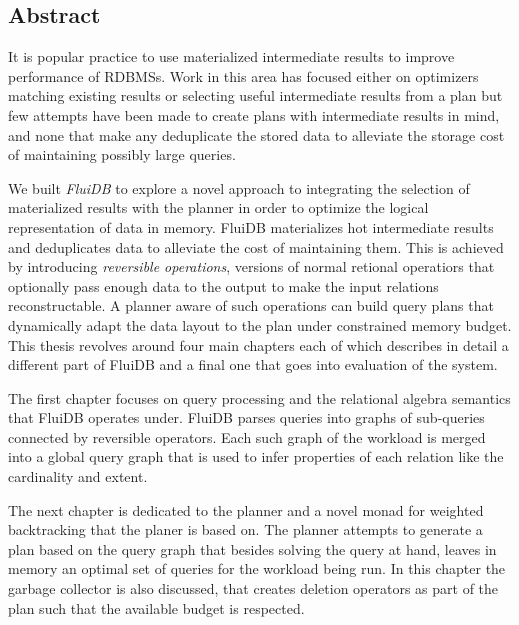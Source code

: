 \setcounter{page}{1}%

\maketitle%

\begin{precontent}

\chapter{Abstract}%
It is popular practice to use materialized intermediate results to
improve performance of RDBMSs. Work in this area has focused either on
optimizers matching existing results or selecting useful intermediate
results from a plan but few attempts have been made to create plans
with intermediate results in mind, and none that make any deduplicate
the stored data to alleviate the storage cost of maintaining possibly
large queries.

We built \emph{FluiDB} to explore a novel approach to integrating the
selection of materialized results with the planner in order to
optimize the logical representation of data in memory. FluiDB
materializes hot intermediate results and deduplicates data to
alleviate the cost of maintaining them. This is achieved by
introducing \emph{reversible operations}, versions of normal retional
operatiors that optionally pass enough data to the output to make the
input relations reconstructable. A planner aware of such operations
can build query plans that dynamically adapt the data layout to the
plan under constrained memory budget. This thesis revolves around four
main chapters each of which describes in detail a different part of
FluiDB and a final one that goes into evaluation of the system.

The first chapter focuses on query processing and the relational
algebra semantics that FluiDB operates under. FluiDB parses queries
into graphs of sub-queries connected by reversible operators. Each
such graph of the workload is merged into a global query graph that is
used to infer properties of each relation like the cardinality and
extent.

The next chapter is dedicated to the planner and a novel monad for
weighted backtracking that the planer is based on. The planner
attempts to generate a plan based on the query graph that besides
solving the query at hand, leaves in memory an optimal set of queries
for the workload being run. In this chapter the garbage collector is
also discussed, that creates deletion operators as part of the plan
such that the available budget is respected.


\end{precontent}
